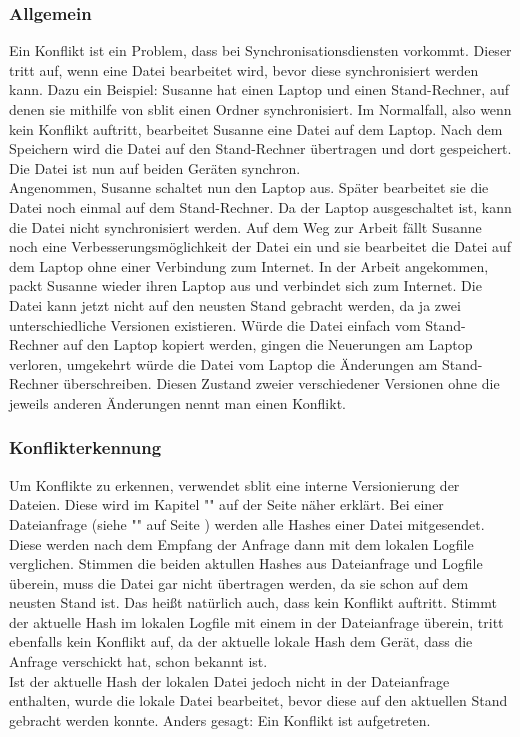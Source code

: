 \subsubsection{Allgemein}
Ein Konflikt ist ein Problem, dass bei Synchronisationsdiensten vorkommt. Dieser tritt auf, wenn eine Datei bearbeitet wird, bevor diese synchronisiert werden kann. Dazu ein Beispiel: Susanne hat einen Laptop und einen Stand-Rechner, auf denen sie mithilfe von sblit einen Ordner synchronisiert. Im Normalfall, also wenn kein Konflikt auftritt, bearbeitet Susanne eine Datei auf dem Laptop. Nach dem Speichern wird die Datei auf den Stand-Rechner übertragen und dort gespeichert. Die Datei ist nun auf beiden Geräten synchron.\\
Angenommen, Susanne schaltet nun den Laptop aus. Später bearbeitet sie die Datei noch einmal auf dem Stand-Rechner. Da der Laptop ausgeschaltet ist, kann die Datei nicht synchronisiert werden. Auf dem Weg zur Arbeit fällt Susanne noch eine Verbesserungsmöglichkeit der Datei ein und sie bearbeitet die Datei auf dem Laptop ohne einer Verbindung zum Internet. In der Arbeit angekommen, packt Susanne wieder ihren Laptop aus und verbindet sich zum Internet. Die Datei kann jetzt nicht auf den neusten Stand gebracht werden, da ja zwei unterschiedliche Versionen existieren. Würde die Datei einfach vom Stand-Rechner auf den Laptop kopiert werden, gingen die Neuerungen am Laptop verloren, umgekehrt würde die Datei vom Laptop die Änderungen am Stand-Rechner überschreiben. Diesen Zustand zweier verschiedener Versionen ohne die jeweils anderen Änderungen nennt man einen Konflikt.

\subsubsection{Konflikterkennung}\label{Konflikterkennung}
Um Konflikte zu erkennen, verwendet sblit eine interne Versionierung der Dateien. Diese wird im Kapitel "" auf der Seite \pageref{Logfile} näher erklärt. Bei einer Dateianfrage (siehe "" auf Seite \pageref{Dateianfragen}) werden alle Hashes einer Datei mitgesendet. Diese werden nach dem Empfang der Anfrage dann mit dem lokalen Logfile verglichen. Stimmen die beiden aktullen Hashes aus Dateianfrage und Logfile überein, muss die Datei gar nicht übertragen werden, da sie schon auf dem neusten Stand ist. Das heißt natürlich auch, dass kein Konflikt auftritt. Stimmt der aktuelle Hash im lokalen Logfile mit einem in der Dateianfrage überein, tritt ebenfalls kein Konflikt auf, da der aktuelle lokale Hash dem Gerät, dass die Anfrage verschickt hat, schon bekannt ist. \\
Ist der aktuelle Hash der lokalen Datei jedoch nicht in der Dateianfrage enthalten, wurde die lokale Datei bearbeitet, bevor diese auf den aktuellen Stand gebracht werden konnte. Anders gesagt: Ein Konflikt ist aufgetreten.

